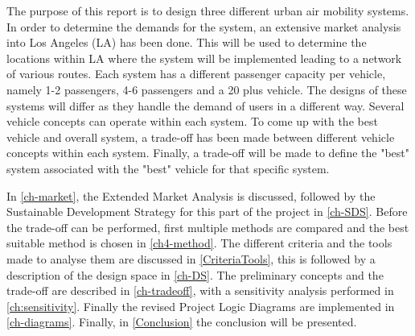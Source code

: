 The purpose of this report is to design three different urban air mobility systems. In order to determine the demands for the system, an extensive market analysis into Los Angeles (LA) has been done. This will be used to determine the locations within LA where the system will be implemented leading to a network of various routes. Each system has a different passenger capacity per vehicle, namely 1-2 passengers, 4-6 passengers and a 20 plus vehicle. The designs of these systems will differ as they handle the demand of users in a different way. Several vehicle concepts can operate within each system. To come up with the best vehicle and overall system, a trade-off has been made between different vehicle concepts within each system. Finally, a trade-off will be made to define the "best" system associated with the "best" vehicle for that specific system. 

In \autoref{ch-market}, the Extended Market Analysis is discussed, followed by the Sustainable Development Strategy for this part of the project in \autoref{ch-SDS}. Before the trade-off can be performed, first multiple methods are compared and the best suitable method is chosen in \autoref{ch4-method}. The different criteria and the tools made to analyse them are discussed in \autoref{CriteriaTools}, this is followed by a description of the design space in \autoref{ch-DS}. The preliminary concepts and the trade-off are described in \autoref{ch-tradeoff}, with a sensitivity analysis performed in \autoref{ch:sensitivity}. Finally the revised Project Logic Diagrams are implemented in \autoref{ch-diagrams}. Finally, in \autoref{Conclusion} the conclusion will be presented.